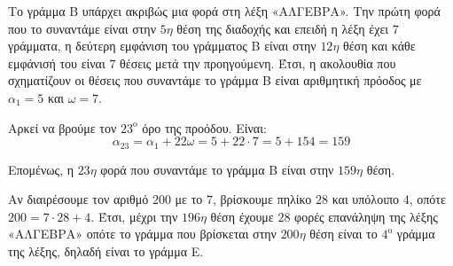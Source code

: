 
\begin{alist}
\item Το γράμμα Β υπάρχει ακριβώς μια φορά στη λέξη «ΑΛΓΕΒΡΑ». Την πρώτη φορά που το
συναντάμε είναι στην $5\eta$ θέση της διαδοχής και επειδή η λέξη έχει $7$ γράμματα, η δεύτερη
εμφάνιση του γράμματος Β είναι στην $12\eta$ θέση και κάθε εμφάνισή του είναι $7$ θέσεις μετά
την προηγούμενη. Έτσι, η ακολουθία που σχηματίζουν οι θέσεις που συναντάμε το γράμμα
Β είναι αριθμητική πρόοδος με $\alpha_1 = 5$ και $\omega = 7$.

\item Αρκεί να βρούμε τον $23^\text{ο}$ όρο της προόδου. Είναι:
\[\alpha_{23} = \alpha_1 + 22\omega = 5 + 22 \cdot 7 = 5 + 154 = 159\]

Επομένως, η $23\eta$ φορά που συναντάμε το γράμμα Β είναι στην $159\eta$ θέση.

\item Αν διαιρέσουμε τον αριθμό $200$ με το $7$, βρίσκουμε πηλίκο $28$ και υπόλοιπο $4$, οπότε
$200 = 7 \cdot 28 + 4$. Έτσι, μέχρι την $196\eta$ θέση έχουμε $28$ φορές επανάληψη της λέξης «ΑΛΓΕΒΡΑ»
οπότε το γράμμα που βρίσκεται στην $200\eta$ θέση είναι το $4^\text{ο}$ γράμμα της λέξης, δηλαδή είναι
το γράμμα Ε.
\end{alist}

